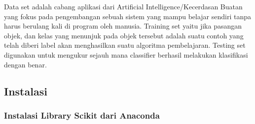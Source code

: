 \begin{enumerate}
\subitem Data set adalah cabang aplikasi dari Artificial Intelligence/Kecerdasan Buatan yang fokus pada pengembangan sebuah sistem yang mampu belajar sendiri tanpa harus berulang kali di program oleh manusia.
\subitem Training set yaitu jika pasangan objek, dan kelas yang menunjuk pada objek tersebut adalah suatu contoh yang telah diberi label akan menghasilkan suatu algoritma pembelajaran.
\subitem Testing set digunakan untuk mengukur sejauh mana classifier berhasil melakukan klasifikasi dengan benar\cite{zhu2009introduction}.
\end{enumerate}


\subsection{Instalasi}
\subsubsection{Instalasi Library Scikit dari Anaconda}

